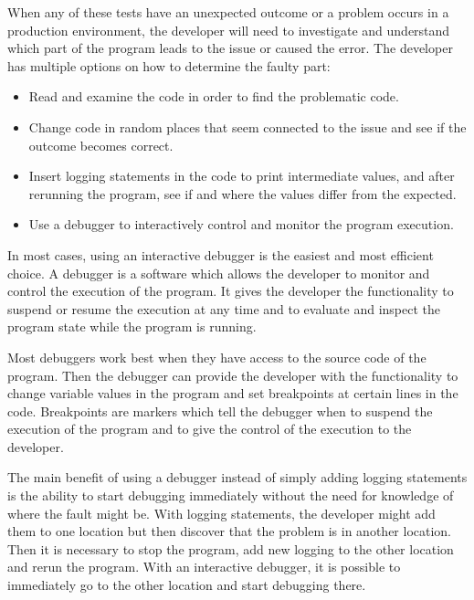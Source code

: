 \documentclass[..thesis.tex]{subfiles}
\begin{document}
When any of these tests have an unexpected outcome or a problem occurs in a production environment, the developer will need to investigate and understand which part of the program leads to the issue or caused the error.
The developer has multiple options on how to determine the faulty part:
\begin{itemize}
  \item Read and examine the code in order to find the problematic code.
  \item Change code in random places that seem connected to the issue and see if the outcome becomes correct.
  \item Insert logging statements in the code to print intermediate values, and after rerunning the program, see if and where the values differ from the expected.
  \item Use a debugger to interactively control and monitor the program execution.
\end{itemize}

In most cases, using an interactive debugger is the easiest and most efficient choice. 
A debugger is a software which allows the developer to monitor and control the execution of the program.
% 
% 
It gives the developer the functionality to suspend or resume the execution at any time and to evaluate and inspect the program state while the program is running. 

Most debuggers work best when they have access to the source code of the program. 
Then the debugger can provide the developer with the functionality to change variable values in the program and set breakpoints at certain lines in the code. 
Breakpoints are markers which tell the debugger when to suspend the execution of the program and to give the control of the execution to the developer.

The main benefit of using a debugger instead of simply adding logging statements is the ability to start debugging immediately without the need for knowledge of where the fault might be.
With logging statements, the developer might add them to one location but then discover that the problem is in another location. 
Then it is necessary to stop the program, add new logging to the other location and rerun the program.
With an interactive debugger, it is possible to immediately go to the other location and start debugging there.
\end{document}
